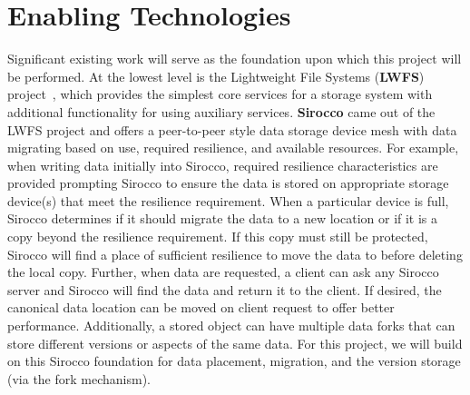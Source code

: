 \section{Enabling Technologies}
\label{sec:enabling-technologies}
Significant existing work will serve as the foundation upon which this project
will be performed.
At the lowest level is the Lightweight File Systems ({\bf LWFS}) project~\cite{oldfield:lwfs},
which provides the simplest core services for a storage system with additional functionality
for using auxiliary services.
%
{\bf Sirocco} came out of the LWFS project and offers a peer-to-peer style data storage device
mesh with data migrating based on use, required resilience, and available
resources. For example, when writing data initially into Sirocco, required
resilience characteristics are provided prompting Sirocco to ensure the data is
stored on appropriate storage device(s) that meet the resilience requirement.
When a particular device is full, Sirocco determines if it should migrate the
data to a new location or if it is a copy beyond the resilience requirement. If
this copy must still be protected, Sirocco will find a place of sufficient 
resilience to move the data to before deleting the local copy. Further, when
data are requested, a client can ask any Sirocco server and Sirocco will find
the data and return it to the client. If desired, the canonical data location
can be moved on client request to offer better performance. Additionally,
a stored object can have multiple data forks that can
store different versions or aspects of the same data.  For this project, we
will build on this Sirocco foundation for data placement, migration, and the
version storage (via the fork mechanism). 


